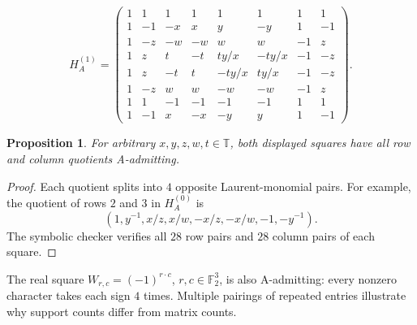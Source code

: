 \documentclass[11pt,a4paper]{article}
\newtheorem{proposition}[theorem]{Proposition}
\theoremstyle{plain}
\theoremstyle{definition}
\numberwithin{equation}{section}
\begin{document}
\begin{equation}\label{eq:HA1}
H_A^{(1)}=
\begin{pmatrix}
1&1&1&1&1&1&1&1\\
1&-1&-x&x&y&-y&1&-1\\
1&-z&-w&-w&w&w&-1&z\\
1&z&t&-t&ty/x&-ty/x&-1&-z\\
1&z&-t&t&-ty/x&ty/x&-1&-z\\
1&-z&w&w&-w&-w&-1&z\\
1&1&-1&-1&-1&-1&1&1\\
1&-1&x&-x&-y&y&1&-1
\end{pmatrix}.
\end{equation}
\begin{proposition}
For arbitrary $x,y,z,w,t\in\mathbb T$, both displayed squares have all row and column quotients A-admitting.
\end{proposition}
\begin{proof}
Each quotient splits into $4$ opposite Laurent-monomial pairs. For example, the quotient of rows $2$ and $3$ in $H_A^{(0)}$ is
$$(1,y^{-1},x/z,x/w,-x/z,-x/w,-1,-y^{-1}).$$
The symbolic checker verifies all $28$ row pairs and $28$ column pairs of each square.
\end{proof}
The real square $W_{r,c}=(-1)^{r\cdot c}$, $r,c\in\mathbb F_2^3$, is also A-admitting: every nonzero character takes each sign $4$ times. Multiple pairings of repeated entries illustrate why support counts differ from matrix counts.
\end{document}
